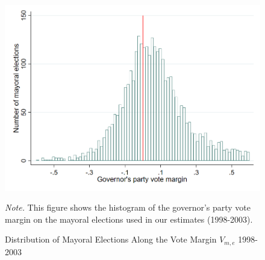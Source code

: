 \documentclass[dv_diss_main.tex]{subfiles}
\begin{document}

\newpage

\begin{figure}[h]
	\begin{center}
			\includegraphics[width=0.8\linewidth]{figures/HistogramGraph.png}
			\caption{Distribution of Mayoral Elections Along the Vote Margin $V_{m,e}$ 1998-2003}\label{fig:hist}
	\end{center}
	\vspace{0.5em}
	\begin{figurenotes}
	\footnotesize	
     \textit{Note. }This figure shows the histogram of the governor's party vote margin on the mayoral elections used in our estimates (1998-2003).
	\end{figurenotes}
\end{figure}

\newpage
\end{document}
